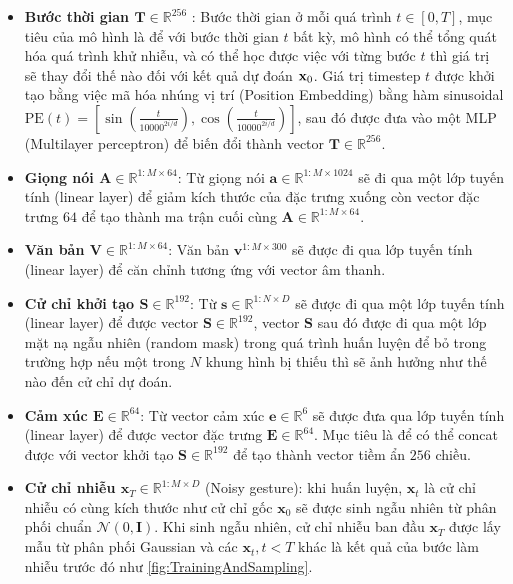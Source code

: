 \begin{itemize}
	\item \textbf{Bước thời gian $\mathbf{T} \in \mathbb{R}^{256}$ }: Bước thời gian ở mỗi quá trình $t \in [0, T]$, mục tiêu của mô hình là để với bước thời gian $t$ bất kỳ, mô hình có thể tổng quát hóa quá trình khử nhiễu, và có thể học được việc với từng bước $t$ thì giá trị sẽ thay đổi thế nào đối với kết quả dự đoán $\mathbf{x}_0$. Giá trị timestep $t$ được khởi tạo bằng việc mã hóa nhúng vị trí (Position Embedding) bằng hàm sinusoidal $\text{PE}(t) = \left[ \sin{\left(\frac{t}{10000^{2i / d}}\right)}, \cos{\left(\frac{t}{10000^{2i / d}}\right)} \right]$, sau đó được đưa vào một MLP (Multilayer perceptron) để biến đổi thành vector $\mathbf{T}  \in \mathbb{R}^{256}$.
	
	  \item \textbf{Giọng nói $\mathbf{A} \in \mathbb{R}^{1:M \times 64}$}: Từ giọng nói $\mathbf{a} \in \mathbb{R}^{1:M \times 1024}$ sẽ đi qua một lớp tuyến tính (linear layer) để giảm kích thước của đặc trưng xuống còn vector đặc trưng $64$ để tạo thành ma trận cuối cùng $\mathbf{A} \in \mathbb{R}^{1:M \times 64}$.
	  
	  \item \textbf{Văn bản $\mathbf{V} \in \mathbb{R}^{1:M \times 64}$}: Văn bản $\mathbf{v}^{1:M \times 300}$ sẽ được đi qua lớp tuyến tính (linear layer) để căn chỉnh tương ứng với vector âm thanh.
	
	\item \textbf{Cử chỉ khởi tạo $\mathbf{S} \in \mathbb{R}^{192}$}: Từ $\mathbf{s} \in \mathbb{R}^{1:N \times D}$ sẽ được đi qua một lớp tuyến tính (linear layer) để được vector $\mathbf{S} \in \mathbb{R}^{192}$, vector $\mathbf{S}$ sau đó được đi qua một lớp mặt nạ ngẫu nhiên (random mask) trong quá trình huấn luyện để bỏ trong trường hợp nếu một trong $N$ khung hình bị thiếu thì sẽ ảnh hưởng như thế nào đến cử chỉ dự đoán.

  \item \textbf{Cảm xúc $\mathbf{E} \in \mathbb{R}^{64}$}: Từ vector cảm xúc $\mathbf{e} \in \mathbb{R}^{6}$ sẽ được đưa qua lớp tuyến tính (linear layer) để được vector đặc trưng $\mathbf{E} \in \mathbb{R}^{64}$. Mục tiêu là để có thể concat được với vector khởi tạo $\mathbf{S} \in \mathbb{R}^{192} $ để tạo thành vector tiềm ẩn $256$ chiều.
  
	\item \textbf{Cử chỉ nhiễu $\mathbf{x}_{T} \in \mathbb{R}^{1:M \times D}$} (Noisy gesture): khi huấn luyện, $\mathbf{x}_{t}$ là cử chỉ nhiễu có cùng kích thước như cử chỉ gốc $\mathbf{x}_{0}$ sẽ được sinh ngẫu nhiên từ phân phối chuẩn $\mathcal{N}(0, \mathbf{I})$. Khi sinh ngẫu nhiên, cử chỉ nhiễu ban đầu $\mathbf{x}_{T}$ được lấy mẫu từ phân phối Gaussian và các $\mathbf{x}_{t}, t<T$ khác là kết quả của bước làm nhiễu trước đó như \autoref{fig:TrainingAndSampling}.
\end{itemize}


